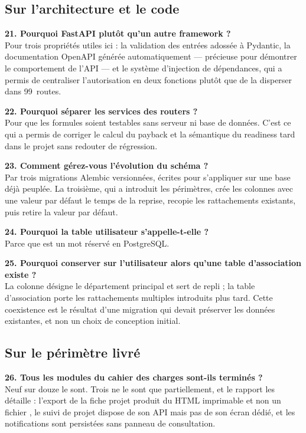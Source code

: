 \subsection*{Sur l'architecture et le code}

\textbf{21. Pourquoi FastAPI plutôt qu'un autre framework ?}\\
Pour trois propriétés utiles ici : la validation des entrées adossée à Pydantic, la
documentation OpenAPI générée automatiquement — précieuse pour démontrer le
comportement de l'API — et le système d'injection de dépendances, qui a permis de
centraliser l'autorisation en deux fonctions plutôt que de la disperser dans 99~routes.

\textbf{22. Pourquoi séparer les services des routers ?}\\
Pour que les formules soient testables sans serveur ni base de données. C'est ce qui a
permis de corriger le calcul du payback et la sémantique du readiness tard dans le
projet sans redouter de régression.

\textbf{23. Comment gérez-vous l'évolution du schéma ?}\\
Par trois migrations Alembic versionnées, écrites pour s'appliquer sur une base déjà
peuplée. La troisième, qui a introduit les périmètres, crée les colonnes avec une valeur
par défaut le temps de la reprise, recopie les rattachements existants, puis retire la
valeur par défaut.

\textbf{24. Pourquoi la table utilisateur s'appelle-t-elle  ?}\\
Parce que  est un mot réservé en PostgreSQL.

\textbf{25. Pourquoi conserver  sur l'utilisateur alors qu'une
table d'association existe ?}\\
La colonne désigne le département principal et sert de repli ; la table d'association
porte les rattachements multiples introduits plus tard. Cette coexistence est le
résultat d'une migration qui devait préserver les données existantes, et non un choix de
conception initial.

\subsection*{Sur le périmètre livré}

\textbf{26. Tous les modules du cahier des charges sont-ils terminés ?}\\
Neuf sur douze le sont. Trois ne le sont que partiellement, et le rapport les détaille :
l'export de la fiche projet produit du HTML imprimable et non un fichier ,
le suivi de projet dispose de son API mais pas de son écran dédié, et les notifications
sont persistées sans panneau de consultation.

